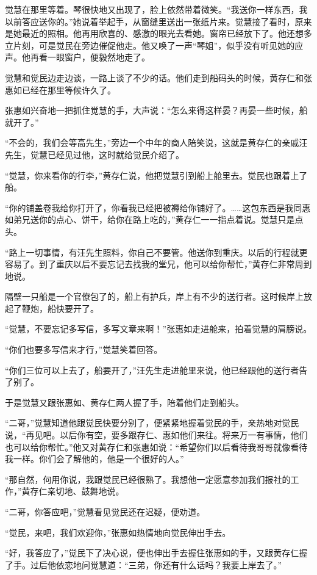 \par 觉慧在那里等着。琴很快地又出现了，脸上依然带着微笑。“我送你一样东西，我以前答应送你的。”她说着举起手，从窗缝里送出一张纸片来。觉慧接了看时，原来是她最近的照相。他再用欣喜的、感激的眼光去看她。窗帘已经放下了。他还想多立片刻，可是觉民在旁边催促他走。他又唤了一声“琴姐”，似乎没有听见她的应声。他再看一眼窗户，便毅然地走了。
\par 觉慧和觉民边走边谈，一路上谈了不少的话。他们走到船码头的时候，黄存仁和张惠如已经在那里等候许久了。
\par 张惠如兴奋地一把抓住觉慧的手，大声说：“怎么来得这样晏？再晏一些时候，船就开了。”
\par “不会的，我们会等高先生，”旁边一个中年的商人陪笑说，这就是黄存仁的亲戚汪先生，觉慧已经见过他，这时就给觉民介绍了。
\par “觉慧，你来看你的行李，”黄存仁说，他把觉慧引到船上舱里去。觉民也跟着上了船。
\par “你的铺盖卷我给你打开了，你看我已经把被褥给你铺好了。……这包东西是我同惠如弟兄送你的点心、饼干，给你在路上吃的，”黄存仁一一指点着说。觉慧只是点头。
\par “路上一切事情，有汪先生照料，你自己不要管。他送你到重庆。以后的行程就更容易了。到了重庆以后不要忘记去找我的堂兄，他可以给你帮忙，”黄存仁非常周到地说。
\par 隔壁一只船是一个官僚包了的，船上有护兵，岸上有不少的送行者。这时候岸上放起了鞭炮，船快要开了。
\par “觉慧，不要忘记多写信，多写文章来啊！”张惠如走进舱来，拍着觉慧的肩膀说。
\par “你们也要多写信来才行，”觉慧笑着回答。
\par “你们三位可以上去了，船要开了，”汪先生走进舱里来说，他已经跟他的送行者告了别了。
\par 于是觉慧又跟张惠如、黄存仁两人握了手，陪着他们走到船头。
\par “二哥，”觉慧知道他跟觉民快要分别了，便紧紧地握着觉民的手，亲热地对觉民说，“再见吧。以后你有空，要多跟存仁、惠如他们来往。将来万一有事情，他们也可以给你帮忙。”他又对黄存仁和张惠如说：“希望你们以后看待我哥哥就像看待我一样。你们会了解他的，他是一个很好的人。”
\par “那自然，何用你说，我跟觉民已经很熟了。我想他一定愿意参加我们报社的工作，”黄存仁亲切地、鼓舞地说。
\par “二哥，你答应吧，”觉慧看见觉民还在迟疑，便劝道。
\par “觉民，来吧，我们欢迎你，”张惠如热情地向觉民伸出手去。
\par “好，我答应了，”觉民下了决心说，便也伸出手去握住张惠如的手，又跟黄存仁握了手。过后他依恋地问觉慧道：“三弟，你还有什么话吗？我要上岸去了。”
